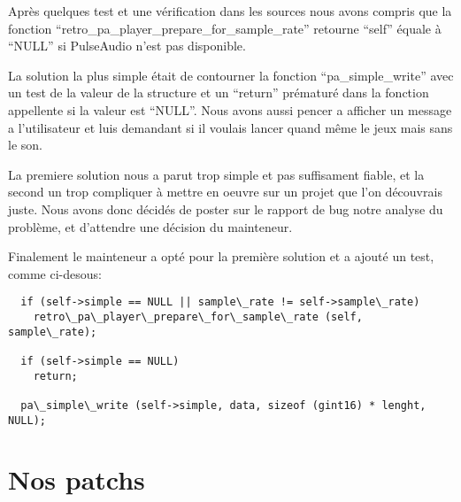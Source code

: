 \documentclass[12pt]{report}
\begin{document}
Après quelques test et une vérification dans les sources nous  avons compris
que la fonction ``retro\_pa\_player\_prepare\_for\_sample\_rate'' retourne ``self''
équale à ``NULL'' si PulseAudio n'est pas disponible.

La solution la plus simple était de contourner la fonction ``pa\_simple\_write''
avec un test de la valeur de la structure et un ``return'' prématuré dans la fonction
appellente si la valeur est ``NULL''. Nous avons aussi pencer a afficher un message a
l'utilisateur et luis demandant si il voulais lancer quand même le jeux mais sans le son.

La premiere solution nous a parut trop simple et pas suffisament fiable, et la
second un trop compliquer à mettre en oeuvre sur un projet que l'on découvrais juste.
Nous avons donc décidés de poster sur le rapport de bug notre analyse du problème, et
d'attendre une décision du mainteneur.

Finalement le mainteneur a opté pour la première solution et a ajouté un test, comme
ci-desous:
\begin{verbatim}
  if (self->simple == NULL || sample\_rate != self->sample\_rate)
    retro\_pa\_player\_prepare\_for\_sample\_rate (self, sample\_rate);

  if (self->simple == NULL)
    return;

  pa\_simple\_write (self->simple, data, sizeof (gint16) * lenght, NULL);
\end{verbatim}

\section{Nos patchs}
\end{document}
